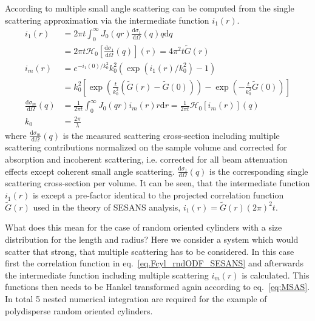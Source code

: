 According to \cite{Schelten1980,Jensen2018} multiple  small angle scattering can be computed from the single scattering approximation via the intermediate function $i_1(r)$.
\begin{align}\label{eq:MSAS_SchmatzSchelten}
 i_1(r) &= 2\pi t \int_0^\infty J_0(qr) \frac{\mathrm{d}\sigma_1}{\mathrm{d}\Omega}(q) q \mathrm{d}q \\
 &=2\pi t \mathcal{H}_0\left[\frac{\mathrm{d}\sigma_1}{\mathrm{d}\Omega}(q)\right](r)= 4\pi^2 t \tilde{G}(r)\\
 i_m(r) &= e^{-i_1(0)/k_0^2}k_0^2\left(\exp\left(i_1(r)/k_0^2\right)-1\right) \\
        &= k_0^2\left[\exp\left(\frac{t}{k_0^2}\left(\tilde{G}(r)-\tilde{G}(0)\right)\right)-\exp\left(-\frac{t}{k_0^2}\tilde{G}(0)\right)\right] \label{eq:MSASim}\\
 \frac{\mathrm{d}\sigma_m}{\mathrm{d}\Omega}(q)&= \frac{1}{2\pi t} \int_0^\infty J_0(qr) i_m(r) r \mathrm{d}r = \frac{1}{2\pi t} \mathcal{H}_0\left[i_m(r)\right](q) \label{eq:MSAS}\\
 k_0 &= \frac{2\pi}{\lambda}
\end{align}
where $\frac{\mathrm{d}\sigma_m}{\mathrm{d}\Omega}(q)$ is the measured scattering cross-section including multiple scattering contributions normalized on the sample volume and  corrected for absorption and incoherent scattering, i.e. corrected for all beam attenuation effects except coherent small angle scattering. $\frac{\mathrm{d}\sigma_1}{\mathrm{d}\Omega}(q)$ is the corresponding single scattering cross-section per volume.
It can be seen, that the intermediate function $i_1(r)$ is except a pre-factor identical to the projected correlation function $\tilde{G}(r)$ used in the theory of  SESANS analysis,
$i_1(r)=\tilde{G}(r)\left(2\pi\right)^2t$.

What does this mean for the case of random oriented cylinders with a size distribution for the length and radius? Here we consider a system which would scatter that strong, that multiple scattering has to be considered. In this case first the correlation function in eq.\ \ref{eq.Fcyl_rndODF_SESANS} and afterwards the intermediate function including multiple scattering $i_m(r)$ is calculated. This functions then needs to be Hankel transformed again according to eq.\ \ref{eq:MSAS}. In total 5 nested numerical integration are required for the example of polydisperse random oriented cylinders.


